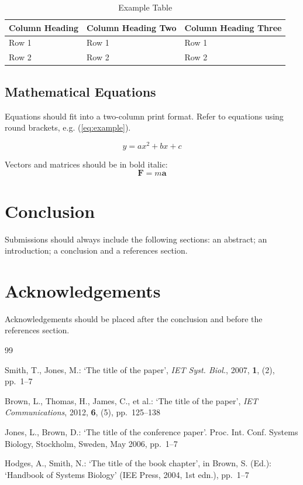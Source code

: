 \documentclass[a4paper, 10pt, twocolumn]{article}
\begin{document}
\begin{table}[htbp]
  \caption{Example Table}
  \label{tab:example}
  \centering
  \small
  \begin{tabular}{lll}
    \toprule
    Column Heading & Column Heading Two & Column Heading Three \\
    \midrule
    Row 1 & Row 1 & Row 1 \\
    Row 2 & Row 2 & Row 2 \\
    \bottomrule
  \end{tabular}
\end{table}

\subsection{Mathematical Equations}

Equations should fit into a two-column print format. Refer to equations using round brackets, e.g. (\ref{eq:example}).

\begin{equation}
  y = ax^2 + bx + c
  \label{eq:example}
\end{equation}

Vectors and matrices should be in bold italic:
\begin{equation}
  \boldsymbol{F} = m \boldsymbol{a}
  \label{eq:newton}
\end{equation}


\section{Conclusion}

Submissions should always include the following sections: an abstract; an introduction; a conclusion and a references section.


\section{Acknowledgements}

Acknowledgements should be placed after the conclusion and before the references section.


\begin{thebibliography}{99}

Smith, T., Jones, M.: `The title of the paper', \textit{IET Syst. Biol.}, 2007, \textbf{1}, (2), pp.~1--7

Brown, L., Thomas, H., James, C., et al.: `The title of the paper', \textit{IET Communications}, 2012, \textbf{6}, (5), pp.~125--138

Jones, L., Brown, D.: `The title of the conference paper'. Proc. Int. Conf. Systems Biology, Stockholm, Sweden, May 2006, pp.~1--7

Hodges, A., Smith, N.: `The title of the book chapter', in Brown, S. (Ed.): `Handbook of Systems Biology' (IEE Press, 2004, 1st edn.), pp.~1--7

\end{thebibliography}
\end{document}
